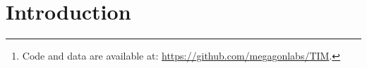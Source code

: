 \documentclass[11pt]{article}
\def \task{\textsc{TIM}\xspace}
\newcommand{\pouya}[1]{{\color{violet}Pouya: #1}}
\begin{document}
\begin{abstract}
This degradation intensifies with tool use; the more frequently a model invokes tools, the less coherent its reasoning becomes. Moreover, tool use shifts errors from arithmetic mistakes toward global reasoning failures (logic, assumption, creativity).
Finally, we propose a preference-optimization-based framework that realigns TaLMs to use tool outputs as assistive evidence, improving both final-answer accuracy and the reasoning depth under tool use.\footnote{Code and data are available at: \url{https://github.com/megagonlabs/TIM}.}

\end{abstract}

\section{Introduction}
\end{document}
